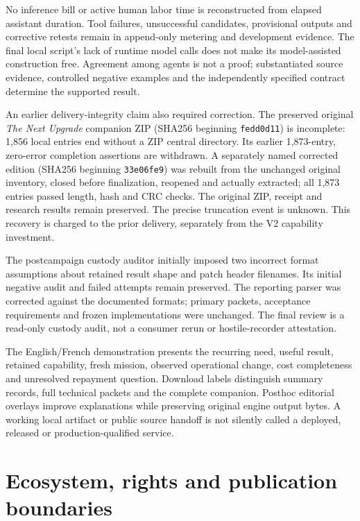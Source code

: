 \documentclass[11pt,a4paper]{article}
\begin{document}
No inference bill or active human labor time is reconstructed from elapsed assistant duration. Tool failures, unsuccessful candidates, provisional outputs and corrective retests remain in append-only metering and development evidence. The final local script's lack of runtime model calls does not make its model-assisted construction free. Agreement among agents is not a proof; substantiated source evidence, controlled negative examples and the independently specified contract determine the supported result.

An earlier delivery-integrity claim also required correction. The preserved original \emph{The Next Upgrade} companion ZIP (SHA256 beginning \texttt{fedd0d11}) is incomplete: 1,856 local entries end without a ZIP central directory. Its earlier 1,873-entry, zero-error completion assertions are withdrawn. A separately named corrected edition (SHA256 beginning \texttt{33e06fe9}) was rebuilt from the unchanged original inventory, closed before finalization, reopened and actually extracted; all 1,873 entries passed length, hash and CRC checks. The original ZIP, receipt and research results remain preserved. The precise truncation event is unknown. This recovery is charged to the prior delivery, separately from the V2 capability investment.\cite{archivecorrection}

The postcampaign custody auditor initially imposed two incorrect format assumptions about retained result shape and patch header filenames. Its initial negative audit and failed attempts remain preserved. The reporting parser was corrected against the documented formats; primary packets, acceptance requirements and frozen implementations were unchanged. The final review is a read-only custody audit, not a consumer rerun or hostile-recorder attestation.\cite{custody}

The English/French demonstration presents the recurring need, useful result, retained capability, fresh mission, observed operational change, cost completeness and unresolved repayment question. Download labels distinguish summary records, full technical packets and the complete companion. Posthoc editorial overlays improve explanations while preserving original engine output bytes. A working local artifact or public source handoff is not silently called a deployed, released or production-qualified service.\cite{productreview,ecosystem}

\section{Ecosystem, rights and publication boundaries}
\end{document}
